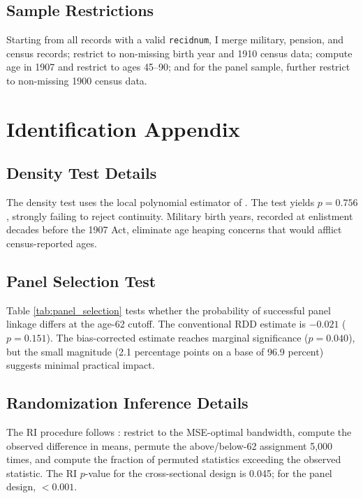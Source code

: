 \documentclass[12pt]{article}
\begin{document}
\subsection{Sample Restrictions}

Starting from all records with a valid \texttt{recidnum}, I merge military, pension, and census records; restrict to non-missing birth year and 1910 census data; compute age in 1907 and restrict to ages 45--90; and for the panel sample, further restrict to non-missing 1900 census data.

\section{Identification Appendix}

\subsection{Density Test Details}

The density test uses the local polynomial estimator of \citet{cattaneo2020rddensity}. The test yields $p = 0.756$, strongly failing to reject continuity. Military birth years, recorded at enlistment decades before the 1907 Act, eliminate age heaping concerns that would afflict census-reported ages.

\subsection{Panel Selection Test}



Table \ref{tab:panel_selection} tests whether the probability of successful panel linkage differs at the age-62 cutoff. The conventional RDD estimate is $-0.021$ ($p = 0.151$). The bias-corrected estimate reaches marginal significance ($p = 0.040$), but the small magnitude (2.1 percentage points on a base of 96.9 percent) suggests minimal practical impact.

\subsection{Randomization Inference Details}

The RI procedure follows \citet{CattaneoFrandsenTitiunik2015}: restrict to the MSE-optimal bandwidth, compute the observed difference in means, permute the above/below-62 assignment 5,000 times, and compute the fraction of permuted statistics exceeding the observed statistic. The RI $p$-value for the cross-sectional design is 0.045; for the panel design, $< 0.001$.
\end{document}
